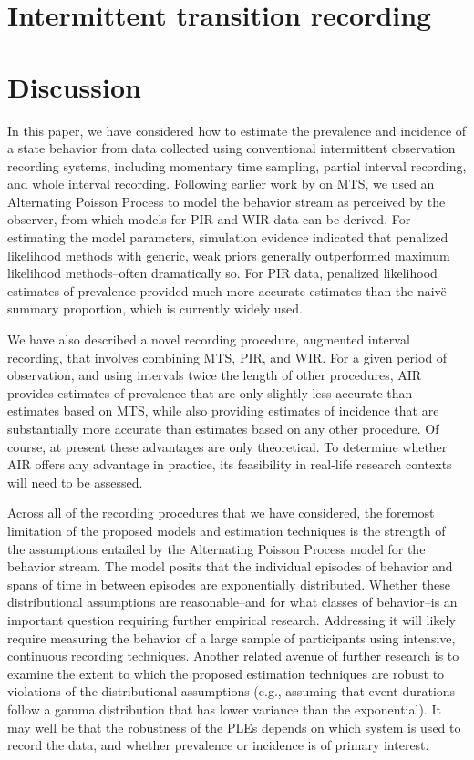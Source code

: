 \documentclass[man, noextraspace, floatsintext]{apa6}\usepackage[]{graphicx}\usepackage[]{color}
\begin{document}
\section{Intermittent transition recording}
\label{sec:ITR}

\section{Discussion}
\label{sec:discussion}

In this paper, we have considered how to estimate the prevalence and incidence of a state behavior from data collected using conventional intermittent observation recording systems, including momentary time sampling, partial interval recording, and whole interval recording. Following earlier work by \citet{Brown1977estimation} on MTS, we used an Alternating Poisson Process to model the behavior stream as perceived by the observer, from which models for PIR and WIR data can be derived. For estimating the model parameters, simulation evidence indicated that penalized likelihood methods with generic, weak priors generally outperformed maximum likelihood methods--often dramatically so. For PIR data, penalized likelihood estimates of prevalence provided much more accurate estimates than the naiv\"e summary proportion, which is currently widely used.

We have also described a novel recording procedure, augmented interval recording, that involves combining MTS, PIR, and WIR. For a given period of observation, and using intervals twice the length of other procedures, AIR provides estimates of prevalence that are only slightly less accurate than estimates based on MTS, while also providing estimates of incidence that are substantially more accurate than estimates based on any other procedure. Of course, at present these advantages are only theoretical. To determine whether AIR offers any advantage in practice, its feasibility in real-life research contexts will need to be assessed.  

Across all of the recording procedures that we have considered, the foremost limitation of the proposed models and estimation techniques is the strength of the assumptions entailed by the Alternating Poisson Process model for the behavior stream. The model posits that the individual episodes of behavior and spans of time in between episodes are exponentially distributed. Whether these distributional assumptions are reasonable--and for what classes of behavior--is an important question requiring further empirical research. Addressing it will likely require measuring the behavior of a large sample of participants using intensive, continuous recording techniques. 
Another related avenue of further research is to examine the extent to which the proposed estimation techniques are robust to violations of the distributional assumptions (e.g., assuming that event durations follow a gamma distribution that has lower variance than the exponential). 
It may well be that the robustness of the PLEs depends on which system is used to record the data, and whether prevalence or incidence is of primary interest.
\end{document}
